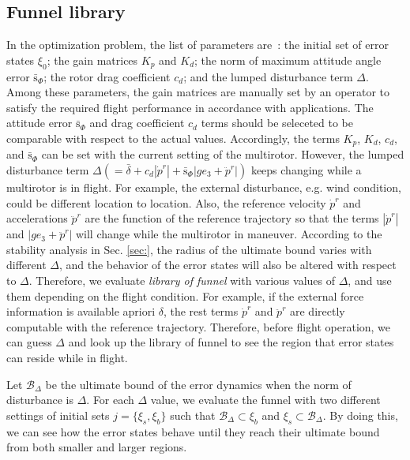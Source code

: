 \documentclass[letterpaper, 10 pt, conference]{ieeeconf}  %
\begin{document}
\subsection{Funnel library}
In the optimization problem, the list of parameters are~: the initial set of error states $\xi_0$; 
the gain matrices $K_p$ and $K_d$; 
the norm of maximum attitude angle error $\bar{\text{s}}_\Phi$;
the rotor drag coefficient $c_d$; and the lumped disturbance term $\Delta$. 
Among these parameters, the gain matrices are manually set by an operator to satisfy the required flight performance in accordance with applications. 
The attitude error $\bar{\text{s}}_\Phi$ and drag coefficient $c_d$ terms should be seleceted to be comparable with respect to the actual values.
Accordingly, the terms $K_p$, $K_d$, $c_d$, and $\bar{\text{s}}_\Phi$ can be set with the current setting of the multirotor.
However, the lumped disturbance term $\Delta(=\bar{\delta}+c_d|\dot{p}^r|+\bar{\text{s}}_\Phi|ge_3 + \ddot{p}^r|)$ keeps changing while a multirotor is in flight. 
For example, the external disturbance, e.g. wind condition, could be different location to location.
Also, the reference velocity $\dot{p}^r$ and accelerations $\ddot{p}^r$ are the function of the reference trajectory so that the terms $|\dot{p}^r|$ and $|ge_3+\ddot{p}^r|$ will change while the multirotor in maneuver.
According to the stability analysis in Sec. \ref{sec:}, 
the radius of the ultimate bound varies with different $\Delta$, 
and the behavior of the error states will also be altered with respect to $\Delta$. 
Therefore, we evaluate \textit{library of funnel} with various values of $\Delta$, and use them depending on the flight condition.
For example, if the external force information is available apriori $\delta$, 
the rest terms $\dot{p}^r$ and $\ddot{p}^r$ are directly computable with the reference trajectory. 
Therefore, before flight operation, we can guess $\Delta$ and look up the library of funnel to see the region that error states can reside while in flight.

Let $\mathcal{B}_\Delta$ be the ultimate bound of the error dynamics when the norm of disturbance is $\Delta$.
For each $\Delta$ value, we evaluate the funnel with two different settings of initial sets $j = \{\xi_s,\xi_b\}$ such that $\mathcal{B}_\Delta\subset\xi_b$ and $\xi_s\subset\mathcal{B}_\Delta$.
By doing this, we can see how the error states behave until they reach their ultimate bound from both smaller and larger regions.
\end{document}
